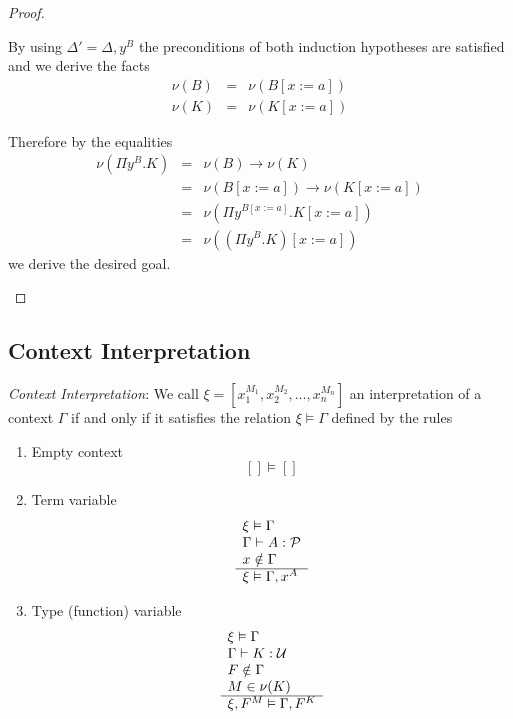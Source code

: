 \begin{theorem}
\begin{proof}
\begin{enumerate}
            By using $\Delta' = \Delta,y^B$ the preconditions of both induction
            hypotheses are satisfied and we derive the facts
            $$
            \begin{array}{lll}
                \nu(B) &=& \nu(B[x:=a])
                \\
                \nu(K) &=& \nu(K[x:=a])
            \end{array}
            $$

            Therefore by the equalities
            $$
            \begin{array}{lll}
                \nu(\Pi y^B.K)
                &=& \nu(B) \to \nu(K)
                \\
                &=& \nu(B[x:=a]) \to \nu(K[x:=a])
                \\
                &=& \nu(\Pi y^{B[x:=a]}. K[x:=a])
                \\
                &=& \nu((\Pi y^B . K)[x:=a])
            \end{array}
            $$
            we derive the desired goal.
        \end{enumerate}
    \end{proof}
\end{theorem}





\subsection{Context Interpretation}

\begin{definition}
    \emph{Context Interpretation}:
    We call $\xi = [x_1^{M_1}, x_2^{M_2}, \ldots, x_n^{M_n}]$ an interpretation
    of a context $\Gamma$ if and only if it satisfies the relation $\xi \vDash
    \Gamma$ defined by the rules
    \begin{enumerate}
    \item Empty context
        $$
        [] \vDash []
        $$
    \item Term variable
        $$
        \begin{array}{l} 
            \xi \vDash \Gamma
            \\
            \Gamma \vdash A : {\cal P}
            \\
            x \notin \Gamma
         \\ \hline 
            \xi \vDash \Gamma,x^A
        \end{array}
        $$
    \item Type (function) variable
        $$
        \begin{array}{l} 
            \xi \vDash \Gamma
            \\
            \Gamma \vdash K: {\cal U}
            \\
            F \notin \Gamma
            \\
            M \in \nu(K)
         \\ \hline 
            \xi,F^M \vDash \Gamma,F^K
        \end{array}
        $$
    \end{enumerate}
\end{definition}


